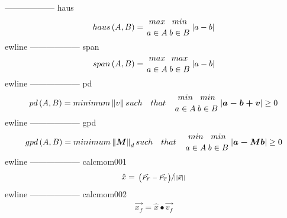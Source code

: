 ------------------
\newline
haus\newline
\begin{equation*}
 \begin{split}
 haus\left( A,B \right) = {max \atop {a \in A }} {min \atop {b \in B}} \left| a-b \right|\end{split}
 \end{equation*}
ewline
------------------
\newline
span\newline
\begin{equation*}
 \begin{split}
 span\left( A,B \right) = {max \atop {a \in A }} {max \atop {b \in B}} \left| a-b \right|\end{split}
 \end{equation*}
ewline
------------------
\newline
pd\newline
\begin{equation*}
 \begin{split}
 pd\left( A,B \right) = minimum \left\Vert v \right\Vert such \quad  that\quad  {min \atop {a \in A }} {min \atop {b \in B}} \left| \boldsymbol{a-b+v} \right|\geq0\end{split}
 \end{equation*}
ewline
------------------
\newline
gpd\newline
\begin{equation*}
 \begin{split}
 gpd\left( A,B \right) = minimum \left\Vert \boldsymbol{M} \right\Vert_d such \quad  that\quad  {min \atop {a \in A }} {min \atop {b \in B}} \left| \boldsymbol{a-Mb} \right|\geq0\end{split}
 \end{equation*}
ewline
------------------
\newline
calcmom001\newline
\begin{equation*}
 \begin{split}
 \hat{x}=\sfrac{\left(\vec{P_F}-\vec{P_T}\right)}{||\vec{x}||}\end{split}
 \end{equation*}
ewline
------------------
\newline
calcmom002\newline
\begin{equation*}
 \begin{split}
 \vec{x_f}=\hat{x}\bullet\vec{v_f}\end{split}
 \end{equation*}
